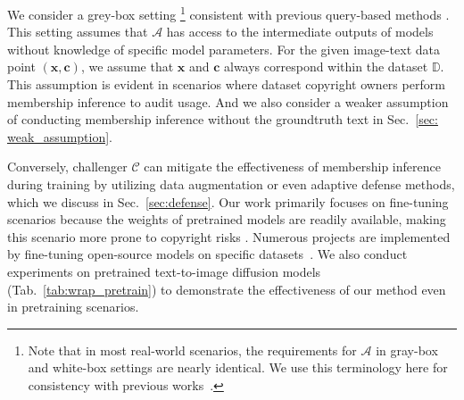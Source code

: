 We consider a grey-box setting
\footnote{Note that in most real-world scenarios, the requirements for  $\mathcal{A}$ in gray-box and white-box settings are nearly identical. We use this terminology here for consistency with previous works~\cite{duan2023diffusion, kong2023efficient}.} 
consistent with previous query-based methods \cite{matsumoto2023membership,duan2023diffusion, kong2023efficient, fu2023probabilistic}. This setting assumes that  $\mathcal{A}$ has access to the intermediate outputs of models without knowledge of specific model parameters.
For the given image-text data point $(\mathbf{x}, \mathbf{c})$, we assume that $\mathbf{x}$ and $\mathbf{c}$ always correspond within the dataset $\mathbb{D}$. This assumption is evident in scenarios where dataset copyright owners perform membership inference to audit usage. And we also consider a weaker assumption of conducting membership inference without the groundtruth text in Sec.~\ref{sec: weak_assumption}.

Conversely, challenger $\mathcal{C}$ can mitigate the effectiveness of membership inference during training by utilizing data augmentation or even adaptive defense methods, which we discuss in Sec.~\ref{sec:defense}. Our work primarily focuses on fine-tuning scenarios because the weights of pretrained models are readily available, making this scenario more prone to copyright risks \cite{wang2023diagnosis, pang2023black}. Numerous projects are implemented by fine-tuning open-source models on specific datasets~\cite{text-to-image-ft, FT-CLOOB-Conditioned, Heart-of-Apple-XL, yeh2023navigating}.
We also conduct experiments on pretrained text-to-image diffusion models (Tab.~\ref{tab:wrap_pretrain}) to demonstrate the effectiveness of our method even in pretraining scenarios.

